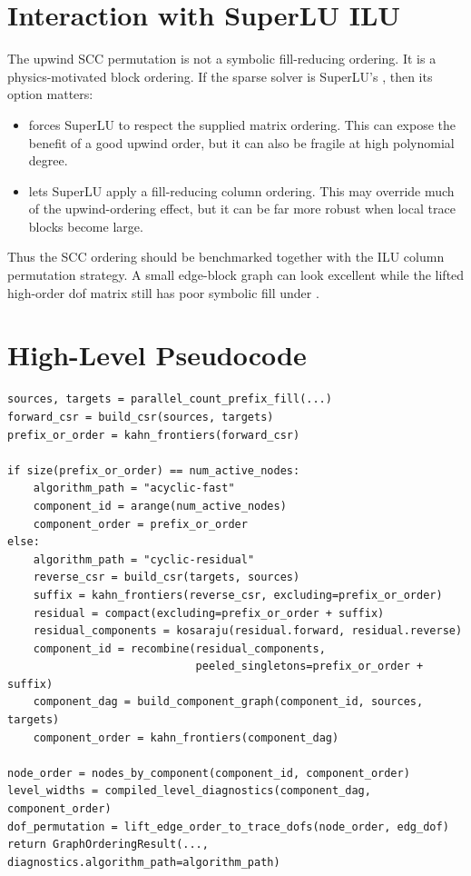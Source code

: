 \documentclass[11pt]{article}
\newcommand{\code}[1]{\texttt{\detokenize{#1}}}
\begin{document}
\section{Interaction with SuperLU ILU}

The upwind SCC permutation is not a symbolic fill-reducing ordering.  It is a
physics-motivated block ordering.  If the sparse solver is SuperLU's
\code{spilu}, then its \code{permc_spec} option matters:
\begin{itemize}
  \item \code{NATURAL} forces SuperLU to respect the supplied matrix ordering.
        This can expose the benefit of a good upwind order, but it can also be
        fragile at high polynomial degree.
  \item \code{COLAMD} lets SuperLU apply a fill-reducing column ordering.  This
        may override much of the upwind-ordering effect, but it can be far more
        robust when local trace blocks become large.
\end{itemize}
Thus the SCC ordering should be benchmarked together with the ILU column
permutation strategy.  A small edge-block graph can look excellent while the
lifted high-order dof matrix still has poor symbolic fill under \code{NATURAL}.

\section{High-Level Pseudocode}

\begin{lstlisting}
sources, targets = parallel_count_prefix_fill(...)
forward_csr = build_csr(sources, targets)
prefix_or_order = kahn_frontiers(forward_csr)

if size(prefix_or_order) == num_active_nodes:
    algorithm_path = "acyclic-fast"
    component_id = arange(num_active_nodes)
    component_order = prefix_or_order
else:
    algorithm_path = "cyclic-residual"
    reverse_csr = build_csr(targets, sources)
    suffix = kahn_frontiers(reverse_csr, excluding=prefix_or_order)
    residual = compact(excluding=prefix_or_order + suffix)
    residual_components = kosaraju(residual.forward, residual.reverse)
    component_id = recombine(residual_components,
                             peeled_singletons=prefix_or_order + suffix)
    component_dag = build_component_graph(component_id, sources, targets)
    component_order = kahn_frontiers(component_dag)

node_order = nodes_by_component(component_id, component_order)
level_widths = compiled_level_diagnostics(component_dag, component_order)
dof_permutation = lift_edge_order_to_trace_dofs(node_order, edg_dof)
return GraphOrderingResult(..., diagnostics.algorithm_path=algorithm_path)
\end{lstlisting}
\end{document}
